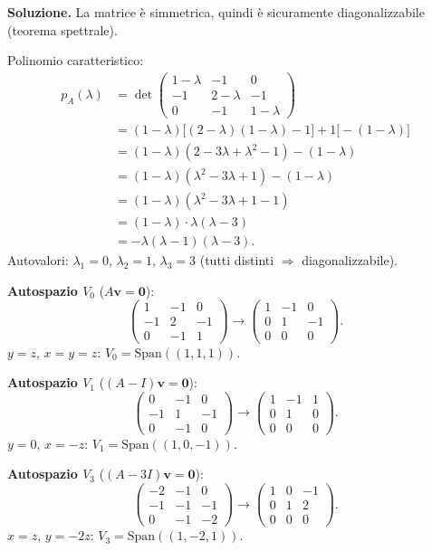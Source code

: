 \textbf{Soluzione.} La matrice è simmetrica, quindi è sicuramente diagonalizzabile (teorema spettrale).

Polinomio caratteristico:
\begin{align*}
    p_A(\lambda) &= \det\begin{pmatrix} 1-\lambda & -1 & 0 \\ -1 & 2-\lambda & -1 \\ 0 & -1 & 1-\lambda \end{pmatrix} \\
    &= (1-\lambda)\big[(2-\lambda)(1-\lambda) - 1\big] + 1\big[-(1-\lambda)\big] \\
    &= (1-\lambda)(2 - 3\lambda + \lambda^2 - 1) - (1-\lambda) \\
    &= (1-\lambda)(\lambda^2 - 3\lambda + 1) - (1-\lambda) \\
    &= (1-\lambda)(\lambda^2 - 3\lambda + 1 - 1) \\
    &= (1-\lambda) \cdot \lambda(\lambda - 3) \\
    &= -\lambda(\lambda - 1)(\lambda - 3).
\end{align*}
Autovalori: $\lambda_1 = 0$, $\lambda_2 = 1$, $\lambda_3 = 3$ (tutti distinti $\Rightarrow$ diagonalizzabile).

\textbf{Autospazio $V_0$} ($A\mathbf{v} = \mathbf{0}$):
\[ \begin{pmatrix} 1 & -1 & 0 \\ -1 & 2 & -1 \\ 0 & -1 & 1 \end{pmatrix} \to \begin{pmatrix} 1 & -1 & 0 \\ 0 & 1 & -1 \\ 0 & 0 & 0 \end{pmatrix}. \]
$y = z$, $x = y = z$: $V_0 = \text{Span}((1,1,1))$.

\textbf{Autospazio $V_1$} ($(A-I)\mathbf{v} = \mathbf{0}$):
\[ \begin{pmatrix} 0 & -1 & 0 \\ -1 & 1 & -1 \\ 0 & -1 & 0 \end{pmatrix} \to \begin{pmatrix} 1 & -1 & 1 \\ 0 & 1 & 0 \\ 0 & 0 & 0 \end{pmatrix}. \]
$y = 0$, $x = -z$: $V_1 = \text{Span}((1,0,-1))$.

\textbf{Autospazio $V_3$} ($(A-3I)\mathbf{v} = \mathbf{0}$):
\[ \begin{pmatrix} -2 & -1 & 0 \\ -1 & -1 & -1 \\ 0 & -1 & -2 \end{pmatrix} \to \begin{pmatrix} 1 & 0 & -1 \\ 0 & 1 & 2 \\ 0 & 0 & 0 \end{pmatrix}. \]
$x = z$, $y = -2z$: $V_3 = \text{Span}((1,-2,1))$.

